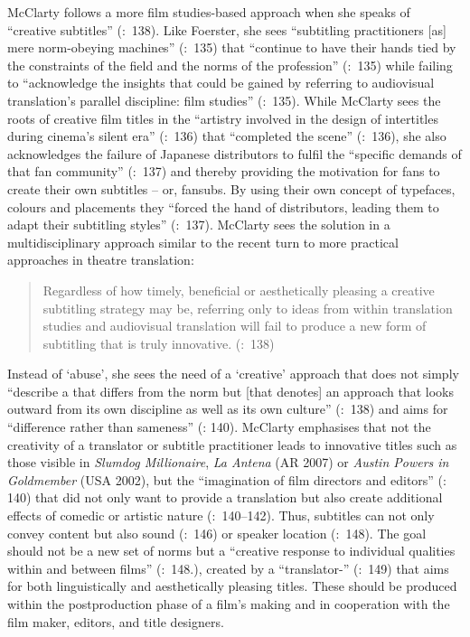 McClarty follows a more film studies-based approach when she speaks of “creative subtitles” (\citeyear{mcclarty2012}:~138). Like Foerster, she sees “subtitling practitioners [as] mere norm-obeying machines” (\citeyear{Foerster2010}:~135) that “continue to have their hands tied by the constraints of the field and the norms of the profession” (\citeyear{Foerster2010}:~135) while failing to “acknowledge the insights that could be gained by referring to audiovisual translation’s parallel discipline: film studies” (\citeyear{Foerster2010}:~135). While McClarty sees the roots of creative film titles in the “artistry involved in the design of intertitles during cinema’s silent era” (\citeyear{mcclarty2012}:~136) that “completed the scene” (\citeyear{mcclarty2012}:~136), she also acknowledges the failure of Japanese  distributors to fulfil the “specific demands of that fan community” (\citeyear{mcclarty2012}:~137) and thereby providing the motivation for fans to create their own subtitles – or, fansubs. By using their own concept of typefaces, colours and placements they “forced the hand of  distributors, leading them to adapt their subtitling styles” (\citeyear{mcclarty2012}:~137). McClarty sees the solution in a multidisciplinary approach similar to the recent turn to more practical approaches in theatre translation:
\begin{quote}
Regardless of how timely, beneficial or aesthetically pleasing a creative subtitling strategy may be, referring only to ideas from within translation studies and audiovisual translation will fail to produce a new form of subtitling that is truly innovative. (\citealt{mcclarty2012}:~138)
\end{quote}
Instead of ‘abuse’, she sees the need of a ‘creative’ approach that does not simply “describe a  that differs from the norm but [that denotes] an approach that looks outward from its own discipline as well as its own culture” (\citealt{mcclarty2012}:~138) and aims for “difference rather than sameness” (\citealt{mcclarty2012}: 140). McClarty emphasises that not the creativity of a translator or subtitle practitioner leads to innovative titles such as those visible in \textit{Slumdog Millionaire}, \textit{La Antena} (AR 2007) or \textit{Austin Powers in Goldmember} (USA 2002), but the “imagination of film directors and editors” (\citeyear{mcclarty2012}: 140) that did not only want to provide a translation but also create additional effects of comedic or artistic nature (\citeyear{mcclarty2012}:~140--142). Thus, subtitles can not only convey content but also sound (\citealt{mcclarty2012}:~146) or speaker location (\citealt{mcclarty2012}:~148). The goal should not be a new set of norms but a “creative response to individual qualities within and between films” (\citeyear{mcclarty2012}:~148.), created by a “translator-” (\citealt{mcclarty2012}:~149) that aims for both linguistically and aesthetically pleasing titles. These should be produced within the postproduction phase of a film’s making and in cooperation with the film maker, editors, and title designers.

